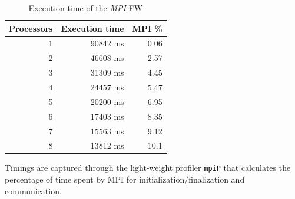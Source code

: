 \begin{table}[h!]
\centering
\begin{tabular}{|r|r|r|}
\hline
\rowcolor[HTML]{F56B00} 
{\color[HTML]{FFFFFF} \textbf{Processors}} & {\color[HTML]{FFFFFF} \textbf{Execution time}} & {\color[HTML]{FFFFFF} \textbf{MPI \%}} \\ \hline
1                                          & 90842 ms                                               & 0.06                                 \\ \hline
2                                          & 46608 ms                                               & 2.57                                 \\ \hline
3                                          & 31309 ms                                               & 4.45                                \\ \hline
4                                          & 24457 ms                                               & 5.47                                \\ \hline
5                                          & 20200 ms                                               & 6.95                                 \\ \hline
6                                          & 17403 ms                                               & 8.35                                \\ \hline
7                                          & 15563 ms                                               & 9.12                                 \\ \hline
8                                          & 13812 ms                                               & 10.1                                \\ \hline
\end{tabular}
\caption{Execution time of the \emph{MPI} FW}                                                                                                                                            
\label{tab:mpi-time}
\end{table}
Timings are captured through the light-weight profiler \texttt{mpiP} that calculates the percentage of time spent by MPI for initialization/finalization and communication.



